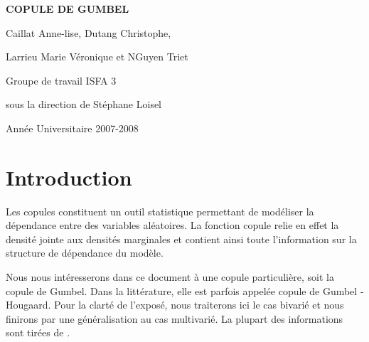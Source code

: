 \documentclass[11pt,a4paper]{article}
\begin{document}


\thispagestyle{empty}
 
\vspace{10cm}
\begin{center} {\huge \textbf{COPULE DE GUMBEL}} \end{center}
\vspace{5cm}
\begin{center} {\Large Caillat Anne-lise, Dutang Christophe,} \end{center}

\begin{center} {\Large Larrieu Marie V\'eronique et NGuyen Triet} \end{center}

\vspace{2cm}
\begin{center} {\large Groupe de travail ISFA 3} \end{center}

\begin{center} {\large sous la direction de St\'ephane Loisel} \end{center}
\vspace{1cm}
\begin{center} {\large Ann\'ee Universitaire 2007-2008} \end{center}


\newpage


\tableofcontents

\newpage

\section{Introduction}

Les copules constituent un outil statistique permettant de mod\'eliser la d\'e\-pen\-dance 
entre des variables al\'eatoires. La fonction copule relie en effet la densit\'e jointe aux 
densit\'es marginales et contient ainsi toute l'information sur la structure de d\'ependance du mod\`ele.

\medskip

Nous nous int\'eresserons dans ce document \`a une copule particuli\`ere, soit la copule de 
Gumbel. Dans la litt\'erature, elle est parfois appel\'ee copule de Gumbel - Hougaard. Pour la 
clart\'e de l'expos\'e, nous traiterons ici le cas bivari\'e et nous finirons par une g\'en\'eralisation 
au cas multivari\'e. La plupart des informations sont tir\'ees de \cite{nelsen}.

\medskip
\end{document}
